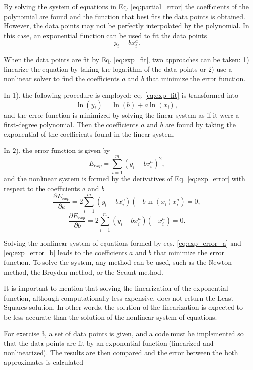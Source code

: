 By solving the system of equations in Eq. \eqref{eq:partial_error} the coefficients of the polynomial are found and the function that best fits the data points is obtained. However, the data points may not be perfectly interpolated by the polynomial. In this case, an exponential function can be used to fit the data points
\begin{equation}
    y_i = bx_i^a.
    \label{eq:exp_fit}
\end{equation}

When the data points are fit by Eq. \eqref{eq:exp_fit}, two approaches can be taken: 1) linearize the equation by taking the logarithm of the data points or 2) use a nonlinear solver to find the coefficients $a$ and $b$ that minimize the error function.

In 1), the following procedure is employed: eq. \eqref{eq:exp_fit} is transformed into
\begin{equation}
    \ln(y_i) = \ln(b) + a\ln(x_i),
\end{equation}
and the error function is minimized by solving the linear system as if it were a first-degree polynomial. Then the coefficients $a$ and $b$ are found by taking the exponential of the coefficients found in the linear system. 

In 2), the error function is given by 
\begin{equation}
    E_{exp} = \sum_{i=1}^{m} (y_i - bx_i^a)^2,
    \label{eq:exp_error}
\end{equation}
and the nonlinear system is formed by the derivatives of Eq. \eqref{eq:exp_error} with respect to the coefficients $a$ and $b$
\begin{equation}
    \frac{\partial E_{exp}}{\partial a} = 2\sum_{i=1}^{m} (y_i - bx_i^a)(-b\ln(x_i)x_i^a) = 0,
    \label{eq:exp_error_a}
\end{equation}
\begin{equation}
    \frac{\partial E_{exp}}{\partial b} = 2\sum_{i=1}^{m} (y_i - bx_i^a)(-x_i^a) = 0.
    \label{eq:exp_error_b}
\end{equation}

Solving the nonlinear system of equations formed by eqs. \eqref{eq:exp_error_a} and \eqref{eq:exp_error_b} leads to the coefficients $a$ and $b$ that minimize the error function. To solve the system, any method can be used, such as the Newton method, the Broyden method, or the Secant method.

It is important to mention that solving the linearization of the exponential function, although computationally less expensive, does not return the Least Squares solution. In other words, the solution of the linearization is expected to be less accurate than the solution of the nonlinear system of equations. 

For exercise 3, a set of data points is given, and a code must be implemented so that the data points are fit by an exponential function (linearized and nonlinearized). The results are then compared and the error between the both approximates is calculated.